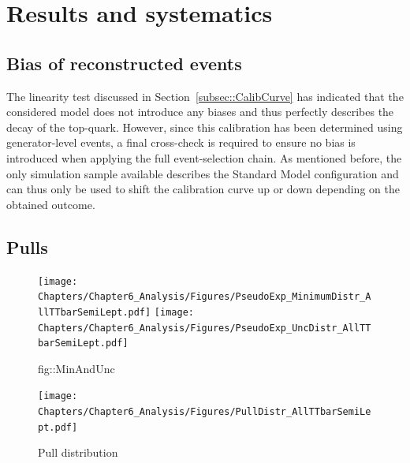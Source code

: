 \section{Results and systematics} \label{sec::Meas}

\subsection{Bias of reconstructed events}
The linearity test discussed in Section~\ref{subsec::CalibCurve} has indicated that the considered model does not introduce any biases and thus perfectly describes the decay of the top-quark. However, since this calibration has been determined using generator-level events, a final cross-check is required to ensure no bias is introduced when applying the full event-selection chain.
As mentioned before, the only simulation sample available describes the Standard Model configuration and can thus only be used to shift the calibration curve up or down depending on the obtained outcome.

\subsection{Pulls}

\begin{figure}[h!t]
 \centering
 \texttt{[image: Chapters/Chapter6\_Analysis/Figures/PseudoExp\_MinimumDistr\_AllTTbarSemiLept.pdf]}
 \texttt{[image: Chapters/Chapter6\_Analysis/Figures/PseudoExp\_UncDistr\_AllTTbarSemiLept.pdf]}
 \caption{Minimum and uncertainty distribution obtained for the 1000 considered pseudo experiments. (all semiLept TT)}  \caption{fig::MinAndUnc}
\end{figure}

\begin{figure}[h!t]
 \centering
 \texttt{[image: Chapters/Chapter6\_Analysis/Figures/PullDistr\_AllTTbarSemiLept.pdf]}
 \caption{Pull distribution} \label{fig::PullDistr}
\end{figure}


